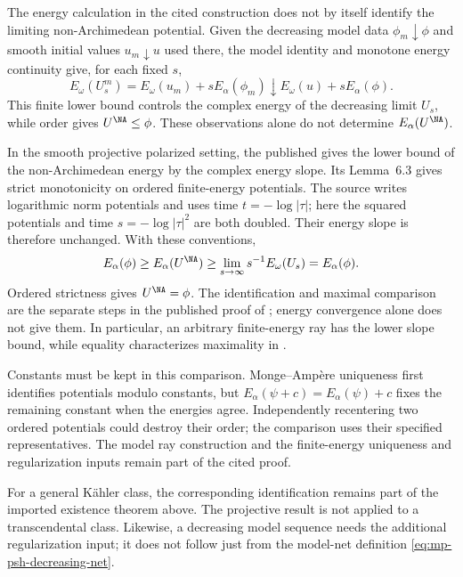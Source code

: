 \begin{remark}\label{rem:mp-maximal-limit-inputs}
The energy calculation in the cited construction does not by itself identify the limiting non-Archimedean potential. Given the decreasing model data $\phi_m\downarrow\phi$ and smooth initial values $u_m\downarrow u$ used there, the model identity and monotone energy continuity give, for each fixed $s$,
\[
 E_\omega(U^m_s)=E_\omega(u_m)+sE_\alpha(\phi_m)
       \downarrow E_\omega(u)+sE_\alpha(\phi).
\]
This finite lower bound controls the complex energy of the decreasing limit $U_s$, while order gives $U^{\NA}\leq\phi$. These observations alone do not determine $E_\alpha(U^{\NA})$.

In the smooth projective polarized setting, the published
\cite[Theorem~6.4]{BBJ21} gives the lower bound of the
non-Archimedean energy by the complex energy slope. Its
Lemma~6.3 gives strict monotonicity on ordered finite-energy
potentials. The source writes logarithmic norm potentials and
uses time $t=-\log|\tau|$; here the squared potentials and time
$s=-\log|\tau|^2$ are both doubled. Their energy slope is
therefore unchanged. With these conventions,
\[
 E_\alpha(\phi)\geq E_\alpha(U^{\NA})
 \geq\lim_{s\to\infty}s^{-1}E_\omega(U_s)=E_\alpha(\phi).
\]
Ordered strictness gives $U^{\NA}=\phi$. The identification
and maximal comparison are the separate steps in the published
proof of \cite[Theorem~6.6]{BBJ21}; energy convergence alone
does not give them. In particular, an arbitrary finite-energy
ray has the lower slope bound, while equality characterizes
maximality in \cite[Corollary~6.7]{BBJ21}.

Constants must be kept in this comparison. Monge--Amp\`ere
uniqueness first identifies potentials modulo constants, but
$E_\alpha(\psi+c)=E_\alpha(\psi)+c$ fixes the remaining
constant when the energies agree. Independently recentering
two ordered potentials could destroy their order; the
comparison uses their specified representatives. The model
ray construction and the finite-energy uniqueness and
regularization inputs remain part of the cited proof.

For a general K\"ahler class, the corresponding identification
remains part of the imported existence theorem above. The
projective result is not applied to a transcendental class.
Likewise, a decreasing model sequence needs the additional
regularization input; it does not follow just from the
model-net definition \eqref{eq:mp-psh-decreasing-net}.
\end{remark}

